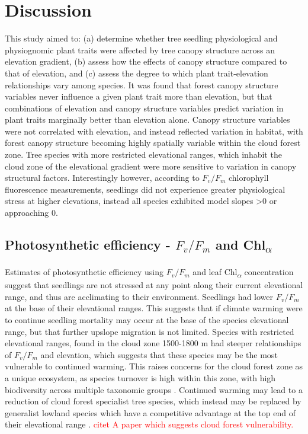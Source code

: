 \documentclass[a4paper, 11pt]{article}
\newcommand{\textapprox}{\raisebox{0.5ex}{\texttildelow}}
\newcommand{\todo}[1]{\textcolor{red}{#1}}   %
\begin{document}


\section*{Discussion}

This study aimed to: (a) determine whether tree seedling physiological and physiognomic plant traits were affected by tree canopy structure across an elevation gradient, (b) assess how the effects of canopy structure compared to that of elevation, and (c) assess the degree to which plant trait-elevation relationships vary among species. It was found that forest canopy structure variables never influence a given plant trait more than elevation, but that combinations of elevation and canopy structure variables predict variation in plant traits marginally better than elevation alone. Canopy structure variables were not correlated with elevation, and instead reflected variation in habitat, with forest canopy structure becoming highly spatially variable within the cloud forest zone. Tree species with more restricted elevational ranges, which inhabit the cloud zone of the elevational gradient were more sensitive to variation in canopy structural factors. Interestingly however, according to $F_v/F_m$ chlorophyll fluorescence measurements, seedlings did not experience greater physiological stress at higher elevations, instead all species exhibited model slopes \textgreater{}0 or approaching 0.

\subsection{Photosynthetic efficiency - $F_v/F_m$ and Chl\textsubscript{$\alpha$}}

Estimates of photosynthetic efficiency using $F_v/F_m$ and leaf Chl\textsubscript{$\alpha$} concentration suggest that seedlings are not stressed at any point along their current elevational range, and thus are acclimating to their environment. Seedlings had lower $F_v/F_m$ at the base of their elevational ranges. This suggests that if climate warming were to continue seedling mortality may occur at the base of the species elevational range, but that further upslope migration is not limited. Species with restricted elevational ranges, found in the cloud zone \textapprox{}1500-1800 m had steeper relationships of $F_v/F_m$ and elevation, which suggests that these species may be the most vulnerable to continued warming. This raises concerns for the cloud forest zone as a unique ecosystem, as species turnover is high within this zone, with high biodiversity across multiple taxonomic groups \citep{Ledo2012}. Continued warming may lead to a reduction of cloud forest specialist tree species, which instead may be replaced by generalist lowland species which have a competitive advantage at the top end of their elevational range \citep{Valladares2008, Nicotra2010}. \todo{citet A paper which suggests cloud forest vulnerability.} 
\end{document}
